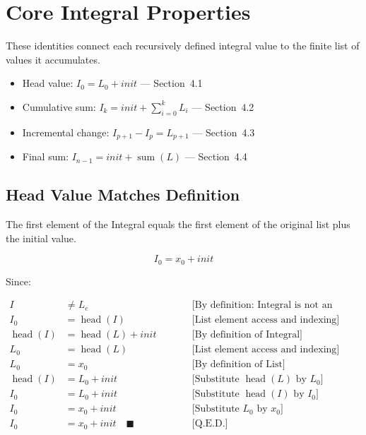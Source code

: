 \section{Core Integral Properties}
\label{sec:core-properties}

These identities connect each recursively defined integral value to the
finite list of values it accumulates.

\begin{itemize}
  \item Head value: $I_0 = L_0 + init$ --- Section~4.1
  \item Cumulative sum: $I_k = init + \sum_{i=0}^k L_i$ --- Section~4.2
  \item Incremental change: $I_{p+1} - I_p = L_{p+1}$ --- Section~4.3
  \item Final sum: $I_{n-1} = init + \operatorname{sum}(L)$ ---
    Section~4.4
\end{itemize}

\subsection{Head Value Matches Definition}
\label{sec:head-value}

The first element of the Integral equals the first element of the original
list plus the initial value.

\begin{equation*}
I_0 = x_0 + init
\end{equation*}

Since:

\begin{equation*}
\begin{aligned}
I &\ne L_e
  & \qquad &\text{[By definition: Integral is not an empty list]} \\
I_0 &= \operatorname{head}(I)
  & \qquad &\text{[List element access and indexing]} \\
\operatorname{head}(I) &= \operatorname{head}(L) + init
  & \qquad &\text{[By definition of Integral]} \\
L_0 &= \operatorname{head}(L)
  & \qquad &\text{[List element access and indexing]} \\
L_0 &= x_0
  & \qquad &\text{[By definition of List]} \\
\operatorname{head}(I) &= L_0 + init
  & \qquad &\text{[Substitute } \operatorname{head}(L) \text{ by } L_0] \\
I_0 &= L_0 + init
  & \qquad &\text{[Substitute } \operatorname{head}(I) \text{ by } I_0] \\
I_0 &= x_0 + init
  & \qquad &\text{[Substitute } L_0 \text{ by } x_0] \\
I_0 &= x_0 + init \quad \blacksquare
  & \qquad &\text{[Q.E.D.]}
\end{aligned}
\end{equation*}

